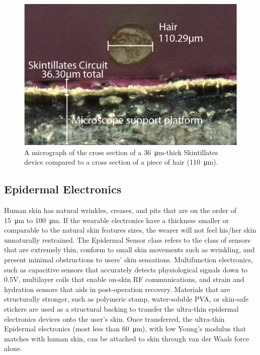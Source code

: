 \documentclass{sigchi}
\begin{document}
\begin{figure}[!h]
\centering
\includegraphics[width=1\columnwidth]{figures/Figure2}
\caption{A micrograph of the cross section of a \SI{36}{\micro\metre}-thick Skintillates device compared to a cross section of a piece of hair (\SI{110}{\micro\metre}).}
\vspace{-8pt}
\label{fig:figure2}
\end{figure}

\subsection{Epidermal Electronics}
Human skin has natural wrinkles, creases, and pits that are on the order of \SI{15}{\micro\metre} to \SI{100}{\micro\metre}. If the wearable electronics have a thickness smaller or comparable to the natural skin features sizes, the wearer will not feel his/her skin unnaturally restrained. The Epidermal Sensor class refers to the class of sensors that are extremely thin, conform to small skin movements such as wrinkling, and present minimal obstructions to users’ skin sensations. Multifunction electronics, such as capacitive sensors that accurately detects physiological signals down to 0.5V, multilayer coils that enable on-skin RF communications, and strain and hydration sensors that aids in post-operation recovery. Materials that are structurally stronger, such as polymeric stamp, water-soluble PVA, or skin-safe stickers are used as a structural backing to transfer the ultra-thin epidermal electronics devices onto the user's skin. Once transferred, the ultra-thin Epidermal electronics (most less than \SI{60}{\micro\metre}), with low Young's modulus that matches with human skin, can be attached to skin through van der Waals force alone. 
\end{document}
